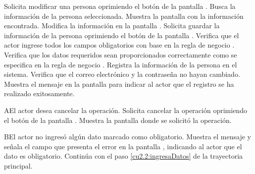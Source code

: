 \begin{UCtrayectoria}
    \UCpaso[\UCactor] Solicita modificar una persona oprimiendo el botón \btnEditar de la pantalla .
    \UCpaso[\UCsist] Busca la información de la persona seleccionada.
    \UCpaso[\UCsist] Muestra la pantalla  con la información encontrada. 
    \UCpaso[\UCactor] Modifica la información en la pantalla . \label{cu2.2:ingresaDatos}
    \UCpaso[\UCactor] Solicita guardar la información de la persona oprimiendo el botón  de la pantalla .  
    \UCpaso[\UCsist] Verifica que el actor ingrese todos los campos obligatorios con base en la regla de negocio  . 
    \UCpaso[\UCsist] Verifica que los datos requeridos sean proporcionados correctamente como se especifica en la regla de negocio .  
    \UCpaso[\UCsist] Registra la información de la persona en el sistema.
    \UCpaso[\UCsist] Verifica que el correo electrónico y la contraseña no hayan cambiado. 
    \UCpaso[\UCsist] Muestra el mensaje  en la pantalla 
    para indicar al actor que el registro se ha realizado exitosamente. \label{cu2.2:muestraMensaje}
 \end{UCtrayectoria}
 \begin{UCtrayectoriaA}{A}{El actor desea cancelar la operación.}
    \UCpaso[\UCactor] Solicita cancelar la operación oprimiendo el botón  de la pantalla .
    \UCpaso[\UCsist] Muestra la pantalla donde se solicitó la operación.
 \end{UCtrayectoriaA} 
 \begin{UCtrayectoriaA}{B}{El actor no ingresó algún dato marcado como obligatorio.}
    \UCpaso[\UCsist] Muestra el mensaje  y señala el campo que presenta el error en la pantalla 
	    , indicando al actor que el dato es obligatorio.
    \UCpaso[] Continúa con el paso \ref{cu2.2:ingresaDatos} de la trayectoria principal.
 \end{UCtrayectoriaA}
